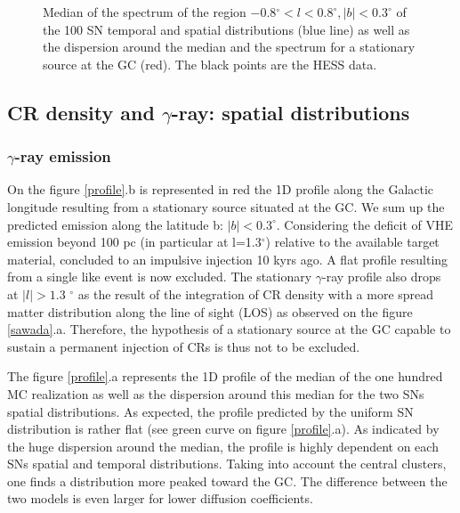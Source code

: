 \documentclass[a4paper,fleqn,usenatbib]{mnras}
\begin{document}
\begin{figure}
\centering
{}
\caption{Median of the spectrum of the region −0.8$^\circ < l < 0.8^\circ, |b| < 0.3^\circ$ of the 100 SN temporal and spatial distributions (blue line) as well as the dispersion around the median and the spectrum for a stationary source at the GC (red). The black points are the HESS data.}
\label{spectrum}
\end{figure}
%
\subsection{CR density and $\gamma$-ray: spatial distributions}
\subsubsection{$\gamma$-ray emission}
On the figure \ref{profile}.b is represented in red the 1D profile along the Galactic longitude resulting from a stationary source situated at the GC. We sum up the predicted emission along the latitude b: $\rvert b \rvert <0.3^\circ$. Considering the deficit of VHE emission beyond 100 pc (in particular at l=1.3$^\circ$) relative to the available target material, \citet{2006Natur.439..695A} concluded to an impulsive injection 10 kyrs ago. A flat profile resulting from a single like event is now excluded. The stationary $\gamma$-ray profile also drops at $\rvert l \rvert >1.3$ $^\circ$ as the result of the integration of CR density with a more spread matter distribution along the line of sight (LOS) \citep{2004MNRAS.349.1167S} as observed on the figure \ref{sawada}.a. Therefore, the hypothesis of a stationary source at the GC capable to sustain a permanent injection of CRs is thus not to be excluded.

The figure \ref{profile}.a represents the 1D profile of the median of the one hundred MC realization as well as the dispersion around this median for the two SNs spatial distributions. As expected, the profile predicted by the uniform SN distribution is rather flat (see green curve on figure \ref{profile}.a). As indicated by the huge dispersion around the median, the profile is highly dependent on each SNs spatial and temporal distributions. Taking into account the central clusters, one finds a distribution more peaked toward the GC. The difference between the two models is even larger for lower diffusion coefficients. 
\end{document}
